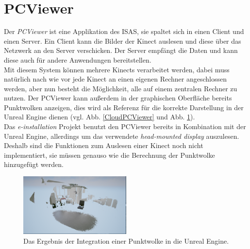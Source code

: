 \documentclass[a4paper]{IEEEtran}
\begin{document}
\section{PCViewer}
	Der {\textit{PCViewer}} ist eine Applikation des ISAS, sie spaltet sich in einen Client und einen Server. 
	Ein Client kann die Bilder der Kinect auslesen und diese über das Netzwerk an den Server verschicken. 
	Der Server empfängt die Daten und kann diese auch für andere Anwendungen bereitstellen.\\
	Mit diesem System können mehrere Kinects verarbeitet werden, dabei muss natürlich nach wie vor jede Kinect an einen eigenen Rechner angeschlossen werden, aber nun besteht die Möglichkeit, alle auf einem zentralen Rechner zu nutzen.
	Der PCViewer kann außerdem in der graphischen Oberfläche bereits Punktwolken anzeigen, dies wird als Referenz für die korrekte Darstellung in der Unreal Engine dienen (vgl. Abb. \ref{CloudPCViewer} und Abb. \ref{Cloud}). \\
	Das {\textit{e-installation}} Projekt benutzt den PCViewer bereits in Kombination mit der Unreal Engine, allerdings um das verwendete {\textit{head-mounted display}} auszulesen. 
	Deshalb sind die Funktionen zum Auslesen einer Kinect noch nicht implementiert, sie müssen genauso wie die Berechnung der Punktwolke hinzugefügt werden. \\[0.5cm]
	
		\begin{figure}[!h]
    	\centering
		\includegraphics[width=0.5\textwidth]{img/Cloud}
	    \caption{Das Ergebnis der Integration einer Punktwolke in die Unreal Engine.}
    	\label{Cloud}
	\end{figure} 
\end{document}
